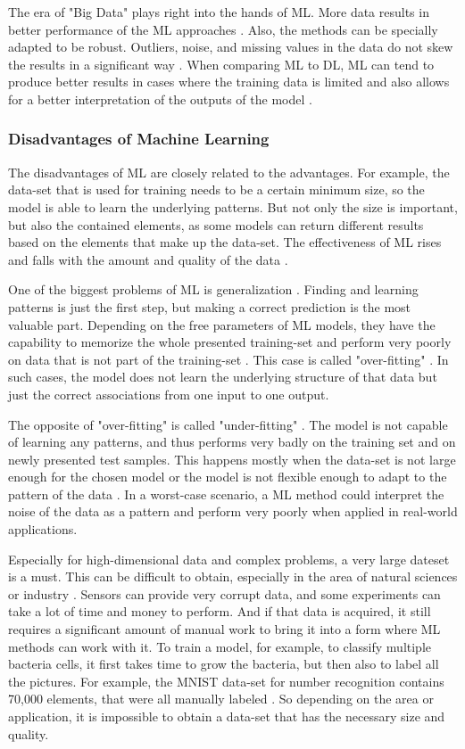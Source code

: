 The era of "Big Data" plays right into the hands of ML. More data results in better performance of the ML approaches \cite{Wuest}. Also, the methods can be specially adapted to be robust. Outliers, noise, and missing values in the data do not skew the results in a significant way \cite{Theodoridis}. When comparing ML to DL, ML can tend to produce better results in cases where the training data is limited and also allows for a better interpretation of the outputs of the model \cite{Janiesch}.

\subsubsection*{Disadvantages of Machine Learning}
The disadvantages of ML are closely related to the advantages. For example, the data-set that is used for training needs to be a certain minimum size, so the model is able to learn the underlying patterns. But not only the size is important, but also the contained elements, as some models can return different results based on the elements that make up the data-set. The effectiveness of ML rises and falls with the amount and quality of the data \cite{Janiesch, Bishop}.

One of the biggest problems of ML is generalization \cite{Bishop}. Finding and learning patterns is just the first step, but making a correct prediction is the most valuable part. Depending on the free parameters of ML models, they have the capability to memorize the whole presented training-set and perform very poorly on data that is not part of the training-set \cite{Zhangpiml}. This case is called "over-fitting" \cite{Jabbar}. In such cases, the model does not learn the underlying structure of that data but just the correct associations from one input to one output. 

The opposite of "over-fitting" is called "under-fitting" \cite{Jabbar}. The model is not capable of learning any patterns, and thus performs very badly on the training set and on newly presented test samples. This happens mostly when the data-set is not large enough for the chosen model or the model is not flexible enough to adapt to the pattern of the data \cite{Will}. In a worst-case scenario, a ML method could interpret the noise of the data as a pattern and perform very poorly when applied in real-world applications.

Especially for high-dimensional data and complex problems, a very large dateset is a must. This can be difficult to obtain, especially in the area of natural sciences or industry \cite{Wuest}. Sensors can provide very corrupt data, and some experiments can take a lot of time and money to perform. And if that data is acquired, it still requires a significant amount of manual work to bring it into a form where ML methods can work with it. To train a model, for example, to classify multiple bacteria cells, it first takes time to grow the bacteria, but then also to label all the pictures. For example, the MNIST data-set for number recognition contains 70,000 elements, that were all manually labeled \cite{Pavlo}. So depending on the area or application, it is impossible to obtain a data-set that has the necessary size and quality. 

